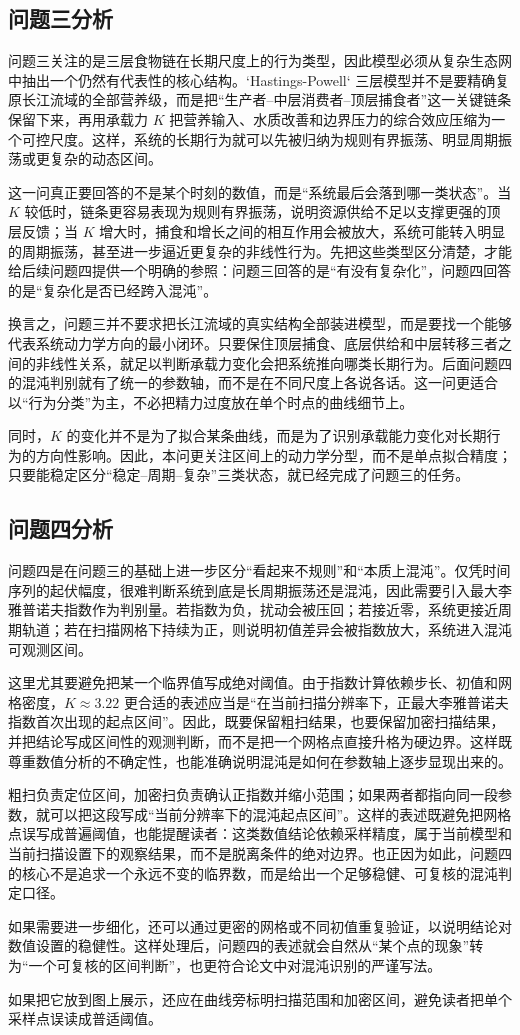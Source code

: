 \subsection{问题三分析}
问题三关注的是三层食物链在长期尺度上的行为类型，因此模型必须从复杂生态网中抽出一个仍然有代表性的核心结构。`Hastings-Powell` 三层模型并不是要精确复原长江流域的全部营养级，而是把“生产者--中层消费者--顶层捕食者”这一关键链条保留下来，再用承载力 \(K\) 把营养输入、水质改善和边界压力的综合效应压缩为一个可控尺度。这样，系统的长期行为就可以先被归纳为规则有界振荡、明显周期振荡或更复杂的动态区间。

这一问真正要回答的不是某个时刻的数值，而是“系统最后会落到哪一类状态”。当 \(K\) 较低时，链条更容易表现为规则有界振荡，说明资源供给不足以支撑更强的顶层反馈；当 \(K\) 增大时，捕食和增长之间的相互作用会被放大，系统可能转入明显的周期振荡，甚至进一步逼近更复杂的非线性行为。先把这些类型区分清楚，才能给后续问题四提供一个明确的参照：问题三回答的是“有没有复杂化”，问题四回答的是“复杂化是否已经跨入混沌”。

换言之，问题三并不要求把长江流域的真实结构全部装进模型，而是要找一个能够代表系统动力学方向的最小闭环。只要保住顶层捕食、底层供给和中层转移三者之间的非线性关系，就足以判断承载力变化会把系统推向哪类长期行为。后面问题四的混沌判别就有了统一的参数轴，而不是在不同尺度上各说各话。这一问更适合以“行为分类”为主，不必把精力过度放在单个时点的曲线细节上。

同时，\(K\) 的变化并不是为了拟合某条曲线，而是为了识别承载能力变化对长期行为的方向性影响。因此，本问更关注区间上的动力学分型，而不是单点拟合精度；只要能稳定区分“稳定--周期--复杂”三类状态，就已经完成了问题三的任务。

\subsection{问题四分析}
问题四是在问题三的基础上进一步区分“看起来不规则”和“本质上混沌”。仅凭时间序列的起伏幅度，很难判断系统到底是长周期振荡还是混沌，因此需要引入最大李雅普诺夫指数作为判别量。若指数为负，扰动会被压回；若接近零，系统更接近周期轨道；若在扫描网格下持续为正，则说明初值差异会被指数放大，系统进入混沌可观测区间。

这里尤其要避免把某一个临界值写成绝对阈值。由于指数计算依赖步长、初值和网格密度，\(K\approx 3.22\) 更合适的表述应当是“在当前扫描分辨率下，正最大李雅普诺夫指数首次出现的起点区间”。因此，既要保留粗扫结果，也要保留加密扫描结果，并把结论写成区间性的观测判断，而不是把一个网格点直接升格为硬边界。这样既尊重数值分析的不确定性，也能准确说明混沌是如何在参数轴上逐步显现出来的。

粗扫负责定位区间，加密扫负责确认正指数并缩小范围；如果两者都指向同一段参数，就可以把这段写成“当前分辨率下的混沌起点区间”。这样的表述既避免把网格点误写成普遍阈值，也能提醒读者：这类数值结论依赖采样精度，属于当前模型和当前扫描设置下的观察结果，而不是脱离条件的绝对边界。也正因为如此，问题四的核心不是追求一个永远不变的临界数，而是给出一个足够稳健、可复核的混沌判定口径。

如果需要进一步细化，还可以通过更密的网格或不同初值重复验证，以说明结论对数值设置的稳健性。这样处理后，问题四的表述就会自然从“某个点的现象”转为“一个可复核的区间判断”，也更符合论文中对混沌识别的严谨写法。

如果把它放到图上展示，还应在曲线旁标明扫描范围和加密区间，避免读者把单个采样点误读成普适阈值。
